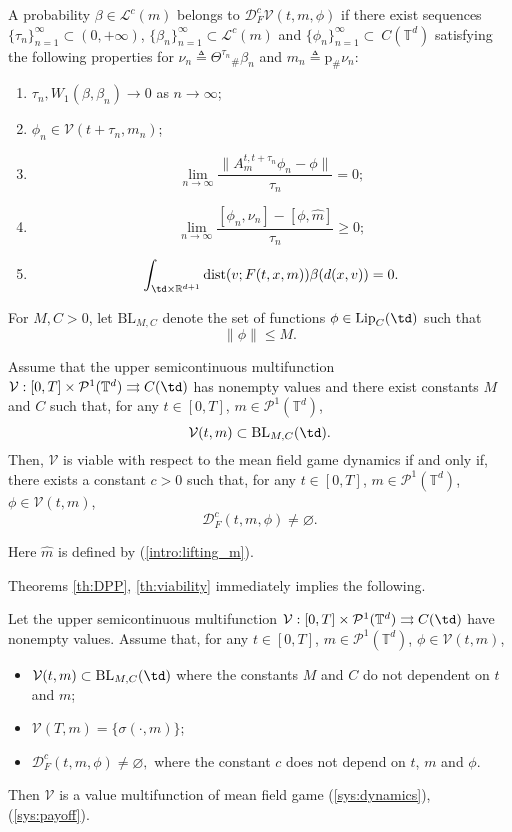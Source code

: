 \documentclass[a4paper,12pt]{article}
\newcommand{\rdp}{\mathbb{R}^{d+1}}
\newcommand{\ptd}{\mathcal{P}^1(\mathbb{T}^d)}
\begin{document}
\begin{definition}\label{def:tangent}
	A probability $\beta\in\mathcal{L}^c(m)$ belongs to $\mathcal{D}_{F}^c\mathcal{V}(t,m,\phi)$ if    there exist sequences $\{\tau_n\}_{n=1}^\infty\subset (0,+\infty)$, $\{\beta_n\}_{n=1}^\infty\subset\mathcal{L}^c(m)$ and $\{\phi_n\}_{n=1}^\infty\subset\ C(\mathbb{T}^d)$ satisfying the following properties for $\nu_n\triangleq \Theta^{\tau_n}{}_\#\beta_n$ and $m_n\triangleq \mathrm{p}_\#\nu_n$:
	\begin{enumerate}
		\item $\tau_n,W_1(\beta,\beta_n)\rightarrow 0$ as $n\rightarrow\infty$;
		\item $\phi_n\in\mathcal{V}(t+\tau_n,m_n)$;
		\item\label{def_tangent:cond_proximate} $$\lim_{n\rightarrow\infty}\frac{\|A^{t,t+\tau_n}_m\phi_n-\phi\|}{\tau_n}=0; $$
		\item\label{def_tangent:cond_optima} 
		$$\lim_{n\rightarrow\infty}\frac{[\phi_n,\nu_n]-[\phi,\widehat{m}]}{\tau_n}\geq 0;$$
		\item $$\int_{\td\times\rdp}\mathrm{dist}(v;F(t,x,m))\beta(d(x,v))=0. $$		
	\end{enumerate}
\end{definition}

For $M,C>0$, let $\mathrm{BL}_{M,C}$ denote the set of  functions $\phi\in \mathrm{Lip}_C(\td)$ such that
$$\|\phi\|\leq M.  $$

\begin{theorem}\label{th:viability}
	Assume that the upper semicontinuous  multifunction $\mathcal{V}:[0,T]\times\ptd\rightrightarrows C(\td)$ has nonempty values and there exist constants $M$ and $C$ such that, for any $t\in [0,T]$, $m\in\ptd$, 
	$$\mathcal{V}(t,m)\subset \mathrm{BL}_{M,C}(\td).$$
	Then, $\mathcal{V}$ is viable with respect to the mean field game dynamics if and only if, there exists a constant $c>0$ such that, for any $t\in [0,T]$, $m\in\ptd$, $\phi\in\mathcal{V}(t,m)$,
	$$\mathcal{D}^c_F(t,m,\phi)\neq\varnothing. $$
\end{theorem} Here $\widehat{m}$ is defined by (\ref{intro:lifting_m}).

Theorems \ref{th:DPP}, \ref{th:viability} immediately implies the following.
\begin{corollary}
	Let the upper semicontinuous  multifunction $\mathcal{V}:[0,T]\times\ptd\rightrightarrows C(\td)$ have nonempty values. Assume that, for any $t\in [0,T]$, $m\in\ptd$, $\phi\in\mathcal{V}(t,m)$,
	\begin{itemize}
		\item $\mathcal{V}(t,m)\subset \mathrm{BL}_{M,C}(\td)$
		where the constants $M$ and $C$ do not dependent on $t$ and $m$;
		\item $\mathcal{V}(T,m)=\{\sigma(\cdot,m)\}$;
		\item $\mathcal{D}^c_F(t,m,\phi)\neq\varnothing, $ where the constant $c$ does not depend on $t$, $m$ and $\phi$.
	\end{itemize} 
	Then $\mathcal{V}$ is a value multifunction of mean field game (\ref{sys:dynamics}), (\ref{sys:payoff}). 
\end{corollary}
\end{document}
